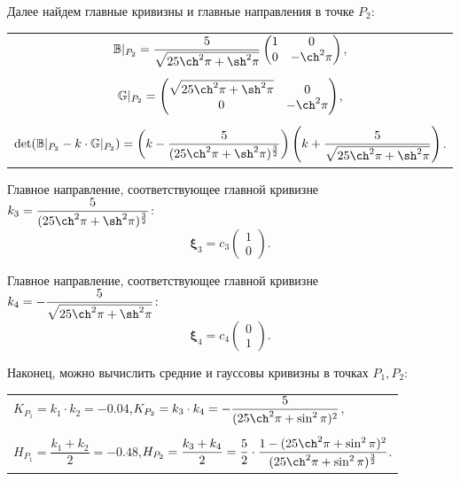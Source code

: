 \documentclass[12pt,a4paper]{article}
\newcommand{\boldVec}[1]{\mathbf #1}
\begin{document}
    Далее найдем главные кривизны и главные направления в точке $ P_2 \colon $
    \begin{table}[h]
        \centering
        \begin{tabular}{c}
            $ \mathbb{B}|_{P_2} = \dfrac{5}{\sqrt{25\ch^2 \pi + \sh^2 \pi}}
                \begin{pmatrix}
                    1 & 0
                    \\
                    0 & -\ch^2 \pi
                \end{pmatrix}
            $,
            \\ \\
            $ \mathbb{G}|_{P_2} = 
                \begin{pmatrix}
                    \sqrt{25\ch^2 \pi + \sh^2 \pi} & 0
                    \\
                    0                          & -\ch^2 \pi
                \end{pmatrix}
            $,
            \\ \\
            $
            \det(\mathbb{B}|_{P_2} - k \cdot \mathbb{G}|_{P_2}) = \left(k - \dfrac{5}{(25 \ch^2 \pi + \sh^2 \pi)^{\frac{3}{2}}}\right) \left(k + \dfrac{5}{\sqrt{25 \ch^2 \pi + \sh^2 \pi}} \right)
            $.
        \end{tabular}
    \end{table}

    Главное направление, соответствующее главной кривизне $k_3 = \dfrac{5}{(25 \ch^2 \pi + \sh^2 \pi)^{\frac{3}{2}}} \colon $
    \[
        \boldVec \xi_3 = c_3
            \begin{pmatrix}
                1
                \\
                0
            \end{pmatrix}\! .
    \]

    Главное направление, соответствующее главной кривизне $k_4 = -\dfrac{5}{\sqrt{25 \ch^2 \pi + \sh^2 \pi}} \colon $
    \[
        \boldVec \xi_4 = c_4
            \begin{pmatrix}
                0
                \\
                1
            \end{pmatrix}\! .
    \]

    Наконец, можно вычислить средние и гауссовы кривизны в точках $ P_1, P_2 \colon$
    \begin{table}[h]
        \centering
        \begin{tabular}{l}
           $ K_{P_1} =  k_1 \cdot k_2 = -0.04 $,\qquad $ K_{P_2} =  k_3 \cdot k_4 = -\dfrac{5}{(25\ch^2 \pi + \sin^2 \pi)^2} $,
           \\ \\
           $ H_{P_1} =  \dfrac{k_1 + k_2}{2} = -0.48 $,\qquad $ H_{P_2} =  \dfrac{k_3 + k_4}{2} = \dfrac{5}{2} \cdot \dfrac{1 - (25\ch^2 \pi + \sin^2 \pi)^2}{(25\ch^2 \pi + \sin^2 \pi)^{\frac{3}{2}}} $.
        \end{tabular}
    \end{table}
\end{document}
